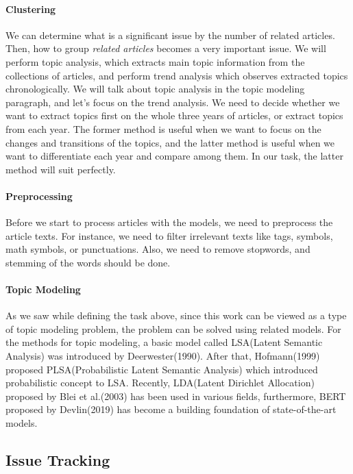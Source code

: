 \documentclass[sigconf,authorversion,nonacm]{acmart}
\begin{document}
\paragraph{Clustering}
We can determine what is a significant issue by the number of related articles.
Then, how to group \emph{related articles} becomes a very important issue.
We will perform topic analysis, which extracts main topic information from
the collections of articles, and perform trend analysis which observes
extracted topics chronologically.
We will talk about topic analysis in the topic modeling paragraph, and
let's focus on the trend analysis.
We need to decide whether we want to extract topics first on the whole three years of articles,
or extract topics from each year. The former method is useful when we want to
focus on the changes and transitions of the topics, and the latter method is
useful when we want to differentiate each year and compare among them.
In our task, the latter method will suit perfectly.

\paragraph{Preprocessing}
Before we start to process articles with the models, we need to preprocess the
article texts.
For instance, we need to filter irrelevant texts like tags, symbols, math symbols, or punctuations.
Also, we need to remove stopwords, and stemming of the words should be done.

\paragraph{Topic Modeling}
As we saw while defining the task above,
since this work can be viewed as a type of topic modeling problem,
the problem can be solved using related models.
For the methods for topic modeling,
a basic model called LSA(Latent Semantic Analysis)
was introduced by Deerwester(1990)\cite{deerwester1990indexing}.
After that, Hofmann(1999) proposed PLSA(Probabilistic Latent Semantic Analysis) which
introduced probabilistic concept to LSA\cite{hofmann1999probabilistic}.
Recently, LDA(Latent Dirichlet Allocation) proposed by Blei et al.(2003)\cite{blei2003latent}
has been used in various fields,
furthermore, BERT proposed by Devlin(2019)\cite{devlin2019bert} has become a building foundation
of state-of-the-art models.

\subsection{Issue Tracking}
\end{document}
